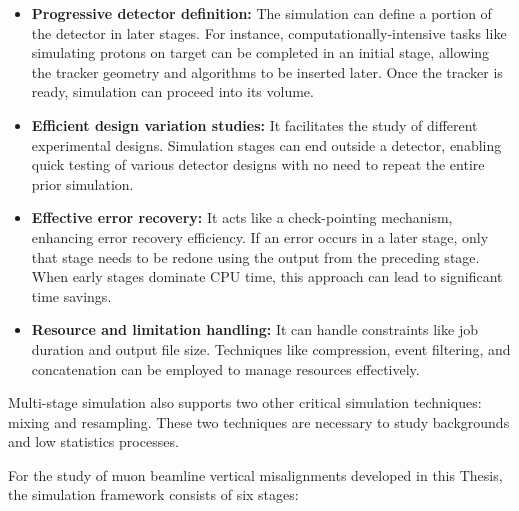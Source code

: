 \begin{itemize}
    \item \textbf{Progressive detector definition:} The simulation can define a portion of the detector in later stages. For instance, computationally-intensive tasks like simulating protons on target can be completed in an initial stage, allowing the tracker geometry and algorithms to be inserted later. Once the tracker is ready, simulation can proceed into its volume.
    \item \textbf{Efficient design variation studies:} It facilitates the study of different experimental designs. Simulation stages can end outside a detector, enabling quick testing of various detector designs with no need to repeat the entire prior simulation.
    \item \textbf{Effective error recovery:} It acts like a check-pointing mechanism, enhancing error recovery efficiency. If an error occurs in a later stage, only that stage needs to be redone using the output from the preceding stage. When early stages dominate CPU time, this approach can lead to significant time savings.
    \item \textbf{Resource and limitation handling:} It can handle constraints like job duration and output file size. Techniques like compression, event filtering, and concatenation can be employed to manage resources effectively.
\end{itemize}

Multi-stage simulation also supports two other critical simulation techniques: mixing and resampling. These two techniques are necessary to study backgrounds and low statistics processes.

For the study of muon beamline vertical misalignments developed in this Thesis, the simulation framework consists of six stages:

